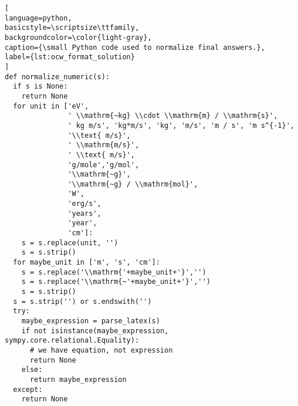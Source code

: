 \documentclass{article}
\begin{document}
\begin{lstlisting}[
language=python,
basicstyle=\scriptsize\ttfamily,
backgroundcolor=\color{light-gray},
caption={\small Python code used to normalize final answers.},
label={lst:ocw_format_solution}
]
def normalize_numeric(s):
  if s is None:
    return None
  for unit in ['eV',
               ' \\mathrm{~kg} \\cdot \\mathrm{m} / \\mathrm{s}',
               ' kg m/s', 'kg*m/s', 'kg', 'm/s', 'm / s', 'm s^{-1}',
               '\\text{ m/s}',
               ' \\mathrm{m/s}',
               ' \\text{ m/s}',
               'g/mole','g/mol',
               '\\mathrm{~g}',
               '\\mathrm{~g} / \\mathrm{mol}',
               'W',
               'erg/s',
               'years',
               'year',
               'cm']:
    s = s.replace(unit, '')
    s = s.strip()
  for maybe_unit in ['m', 's', 'cm']:
    s = s.replace('\\mathrm{'+maybe_unit+'}','')
    s = s.replace('\\mathrm{~'+maybe_unit+'}','')
    s = s.strip()
  s = s.strip('') or s.endswith('')
  try:
    maybe_expression = parse_latex(s)
    if not isinstance(maybe_expression, sympy.core.relational.Equality):
      # we have equation, not expression
      return None
    else:
      return maybe_expression
  except:
    return None


\end{lstlisting}
\end{document}
